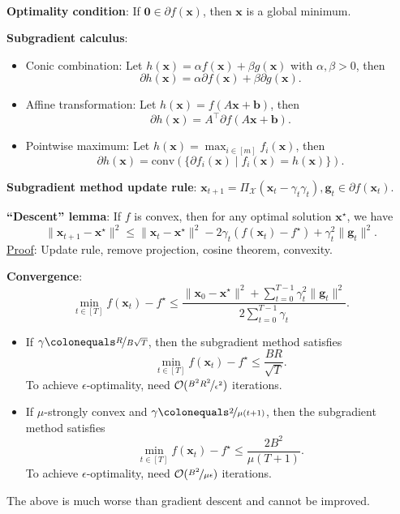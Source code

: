 \documentclass{article}
\renewcommand{\vec}[1]{\mathbf{#1}}
\newcommand{\mat}[1]{#1}
\newcommand{\transpose}[1]{#1^\top}
\newenvironment{topic}[1]
{\textbf{\sffamily \colorbox{black}{\rlap{\textbf{\textcolor{white}{#1}}}\hspace{\linewidth}\hspace{-2\fboxsep}}} \\ \vspace{0.2cm}}
{}
\begin{document}
\begin{multicols*}{2}
\begin{topic}{Subgradient method}
        \textbf{Optimality condition}: If $\vec{0} \in \partial f(\vec{x})$, then $\vec{x}$ is a global minimum.

        \textbf{Subgradient calculus}:
        \begin{itemize}
            \item Conic combination: Let $h(\vec{x}) = \alpha f(\vec{x}) + \beta g(\vec{x})$ with $\alpha, \beta >
                      0$, then \[
                      \partial h(\vec{x}) = \alpha \partial f(\vec{x}) + \beta \partial g(\vec{x}).
                  \]
            \item Affine transformation: Let $h(\vec{x}) = f(\mat{A} \vec{x} + \vec{b})$, then \[
                      \partial h(\vec{x}) = \transpose{\mat{A}} \partial f(\mat{A} \vec{x} + \vec{b}).
                  \]
            \item Pointwise maximum: Let $h(\vec{x}) = \max_{i \in [m]} f_i(\vec{x})$, then \[
                      \partial h(\vec{x}) = \mathrm{conv}(\{ \partial f_i(\vec{x}) \mid f_i(\vec{x}) = h(\vec{x}) \}).
                  \]
        \end{itemize}

        \textbf{Subgradient method update rule}: $\vec{x}_{t+1} = \Pi_{\mathcal{X}}(\vec{x}_t - \gamma_t \gamma_t), \vec{g}_t \in \partial f(\vec{x}_t)$.

        \textbf{``Descent'' lemma}: If $f$ is convex, then for any optimal solution $\vec{x}^\star$, we have \[
            \| \vec{x}_{t+1} - \vec{x}^\star \|^2 \leq \| \vec{x}_t - \vec{x}^\star \|^2 - 2 \gamma_t (f(\vec{x}_t) - f^\star) + \gamma_t^2 \| \vec{g}_t \|^2.
        \]
        \underline{Proof}: Update rule, remove projection, cosine theorem, convexity.

        \textbf{Convergence}: \[
            \min_{t \in [T]} f(\vec{x}_t) - f^\star \leq \frac{\| \vec{x}_0 - \vec{x}^\star \|^2 + \sum_{t=0}^{T-1} \gamma_t^2 \|\vec{g}_t\|^2}{2 \sum_{t=0}^{T-1} \gamma_t}.
        \]
        \begin{itemize}
            \item If $\gamma \colonequals \nicefrac{R}{B \sqrt{T}}$, then the subgradient method satisfies \[
                      \min_{t \in [T]} f(\vec{x}_t) - f^\star \leq \frac{BR}{\sqrt{T}}.
                  \]
                  To achieve $\epsilon$-optimality, need $\mathcal{O}(\nicefrac{B^2 R^2}{\epsilon^2})$ iterations.
            \item If $\mu$-strongly convex and $\gamma \colonequals \nicefrac{2}{\mu(t+1)}$, then the subgradient
                  method satisfies \[
                      \min_{t \in [T]} f(\vec{x}_t) - f^\star \leq \frac{2B^2}{\mu(T+1)}.
                  \]
                  To achieve $\epsilon$-optimality, need $\mathcal{O}(\nicefrac{B^2}{\mu \epsilon})$ iterations.
        \end{itemize}
        The above is much worse than gradient descent and cannot be improved.


\end{topic}
\end{multicols*}
\end{document}
